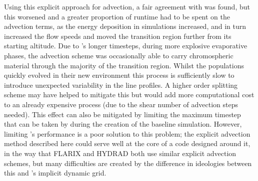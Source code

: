Using this explicit approach for advection, a fair agreement with \Radyn{} was found, but this worsened and a greater proportion of runtime had to be spent on the advection terms, as the energy deposition in simulations increased, and in turn increased the flow speeds and moved the transition region further from its starting altitude.
Due to \Radyn{}'s longer timesteps, during more explosive evaporative phases, the advection scheme was occasionally able to carry chromospheric material through the majority of the transition region.
Whilst the populations quickly evolved in their new environment this process is sufficiently slow to introduce unexpected variability in the line profiles.
A higher order splitting scheme may have helped to mitigate this but would add more computational cost to an already expensive process (due to the shear number of advection steps needed).
This effect can also be mitigated by limiting the maximum timestep that can be taken by \Radyn{} during the creation of the baseline simulation.
However, limiting \Radyn{}'s performance is a poor solution to this problem; the explicit advection method described here could serve well at the core of a code designed around it, in the way that FLARIX and HYDRAD both use similar explicit advection schemes, but many difficulties are created by the difference in ideologies between this and \Radyn{}'s implicit dynamic grid.

